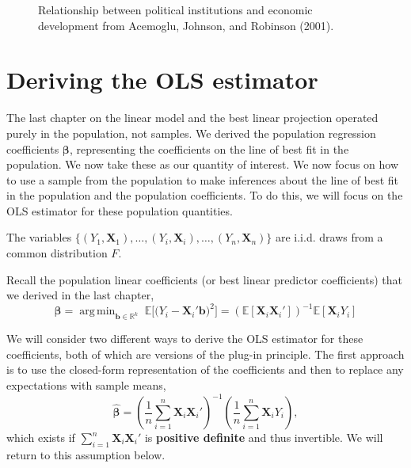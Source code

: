 \documentclass[
  13pt,
  letterpaper,
  DIV=11,
  numbers=noendperiod]{scrreprt}
\newcommand{\mb}{\symbf}
\newcommand{\E}{\mathbb{E}}
\newcommand{\real}{\mathbb{R}}
\newcommand{\X}{\mb{X}}
\newcommand{\bfbeta}{\mb{\beta}}
\newcommand{\bhat}{\widehat{\mb{\beta}}}
\DeclareMathOperator*{\argmin}{arg\,min}
\theoremstyle{definition}
\theoremstyle{definition}
\theoremstyle{plain}
\theoremstyle{remark}
\begin{document}
\begin{figure}[th]


\caption{\label{fig-ajr-scatter}Relationship between political
institutions and economic development from Acemoglu, Johnson, and
Robinson (2001).}

\end{figure}%

\section{Deriving the OLS estimator}\label{deriving-the-ols-estimator}

The last chapter on the linear model and the best linear projection
operated purely in the population, not samples. We derived the
population regression coefficients \(\bfbeta\), representing the
coefficients on the line of best fit in the population. We now take
these as our quantity of interest. We now focus on how to use a sample
from the population to make inferences about the line of best fit in the
population and the population coefficients. To do this, we will focus on
the OLS estimator for these population quantities.

\begin{tcolorbox}[enhanced jigsaw, leftrule=.75mm, colbacktitle=quarto-callout-note-color!10!white, title=\textcolor{quarto-callout-note-color}{\faInfo}\hspace{0.5em}{Assumption}, toptitle=1mm, breakable, left=2mm, toprule=.15mm, arc=.35mm, opacitybacktitle=0.6, opacityback=0, colback=white, rightrule=.15mm, titlerule=0mm, colframe=quarto-callout-note-color-frame, bottomtitle=1mm, bottomrule=.15mm, coltitle=black]

The variables
\(\{(Y_1, \X_1), \ldots, (Y_i,\X_i), \ldots, (Y_n, \X_n)\}\) are i.i.d.
draws from a common distribution \(F\).

\end{tcolorbox}

Recall the population linear coefficients (or best linear predictor
coefficients) that we derived in the last chapter, \[ 
\bfbeta = \argmin_{\mb{b} \in \real^k}\; \E\bigl[ \bigl(Y_{i} - \mb{X}_{i}'\mb{b} \bigr)^2\bigr] = \left(\E[\X_{i}\X_{i}']\right)^{-1}\E[\X_{i}Y_{i}]
\]

We will consider two different ways to derive the OLS estimator for
these coefficients, both of which are versions of the plug-in principle.
The first approach is to use the closed-form representation of the
coefficients and then to replace any expectations with sample means, \[ 
\bhat = \left(\frac{1}{n} \sum_{i=1}^n \X_i\X_i' \right)^{-1} \left(\frac{1}{n} \sum_{i=1}^n \X_{i}Y_{i} \right),
\] which exists if \(\sum_{i=1}^n \X_i\X_i'\) is \textbf{positive
definite} and thus invertible. We will return to this assumption below.
\end{document}
